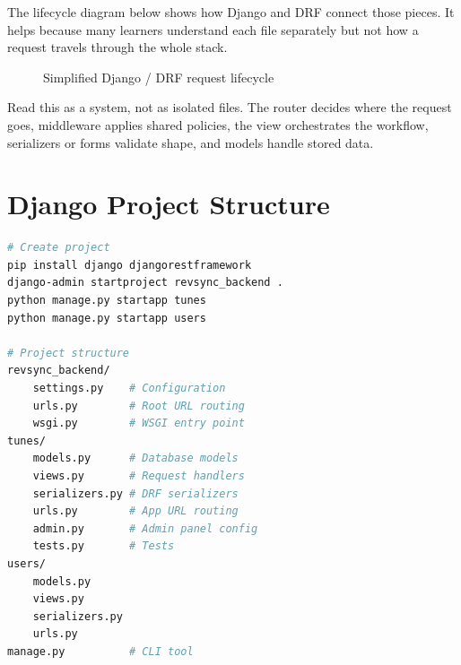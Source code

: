 \documentclass[12pt, a4paper, oneside]{book}
\begin{document}
The lifecycle diagram below shows how Django and DRF connect those pieces. It helps because many learners understand each file separately but not how a request travels through the whole stack.

\begin{figure}[H]
\centering
{}
\caption{Simplified Django / DRF request lifecycle}
\label{fig:django-request-lifecycle}
\end{figure}

Read this as a system, not as isolated files. The router decides where the request goes, middleware applies shared policies, the view orchestrates the workflow, serializers or forms validate shape, and models handle stored data.

\section{Django Project Structure}

\begin{lstlisting}[language=bash, caption={Django project setup}]
# Create project
pip install django djangorestframework
django-admin startproject revsync_backend .
python manage.py startapp tunes
python manage.py startapp users

# Project structure
revsync_backend/
    settings.py    # Configuration
    urls.py        # Root URL routing
    wsgi.py        # WSGI entry point
tunes/
    models.py      # Database models
    views.py       # Request handlers
    serializers.py # DRF serializers
    urls.py        # App URL routing
    admin.py       # Admin panel config
    tests.py       # Tests
users/
    models.py
    views.py
    serializers.py
    urls.py
manage.py          # CLI tool
\end{lstlisting}
\end{document}
